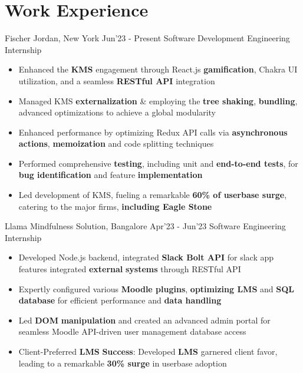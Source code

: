 \section*{\sc Work Experience}
\vspace{-2mm}
\hrulefill
\vspace{1mm}

\excventry
{Fischer Jordan, New York}
{Jun'23 - Present}
{ Software Development Engineering Internship}
{
  \begin{itemize}
    \item  Enhanced the \textbf{KMS} engagement through React.js \textbf{gamification}, Chakra UI utilization, and a seamless \textbf{RESTful API} integration
    \item Managed KMS \textbf{externalization} \& employing the \textbf{tree shaking}, \textbf{bundling}, advanced optimizations to achieve a global modularity
    \item Enhanced performance by optimizing Redux API calls via \textbf{asynchronous actions}, \textbf{memoization} and code splitting techniques
    \item Performed comprehensive \textbf{testing}, including unit and \textbf{end-to-end tests}, for \textbf{bug identification} and feature \textbf{implementation}
    \item Led development of KMS, fueling a remarkable \textbf{60\% of userbase surge}, catering to the major firms, \textbf{including Eagle Stone}
  \end{itemize}
}

\excventry
{Llama Mindfulness Solution, Bangalore}
{Apr'23 - Jun'23}
{ Software Engineering Internship}
{
  \begin{itemize}
  
    \item Developed Node.js backend, integrated \textbf{Slack Bolt API} for slack app features integrated \textbf{external} \textbf{systems} through RESTful API
    \item Expertly configured various \textbf{Moodle plugins}, \textbf{optimizing LMS} and \textbf{SQL database} for efficient performance and \textbf{data handling}
    \item Led \textbf{DOM} \textbf{manipulation} and created an advanced admin portal for seamless Moodle API-driven user management database access
    \item Client-Preferred \textbf{LMS} \textbf{Success}: Developed \textbf{LMS} garnered client favor, leading to a remarkable \textbf{30\% surge} in userbase adoption
  \end{itemize}
}

